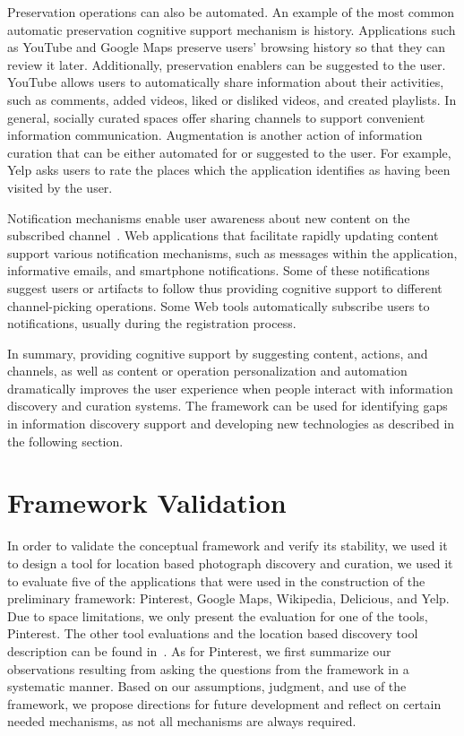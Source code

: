 \documentclass[review]{elsarticle}
\newcommand{\feature}[1]{{\ttfamily#1}}
\begin{document}
{{{{Preservation operations can also be automated. An example of the most common automatic preservation cognitive support mechanism is \feature{history}. Applications such as YouTube and Google Maps preserve users' browsing history so that they can review it later. Additionally, preservation enablers can be \feature{suggested} to the user.
% 
YouTube allows users to \feature{automatically share} information about their activities, such as comments,  added videos, liked or disliked videos, and created playlists. In general, socially curated spaces offer \feature{sharing channels} to support convenient information communication.
%
Augmentation is another action of information curation that can be either \feature{automated} for or \feature{suggested} to the user. For example, Yelp asks users to rate the places which the application identifies as having been visited by the user. 

Notification mechanisms enable user awareness about new content on the subscribed channel~\cite{millen2005social}. Web applications that facilitate rapidly updating content support various notification mechanisms, such as messages within the application, informative emails, and smartphone notifications. Some of these notifications \feature{suggest users or artifacts to follow} thus providing cognitive support to different channel-picking operations. Some Web tools \feature{automatically subscribe} users to notifications, usually during the registration process.
} %

In summary, providing cognitive support by suggesting content, actions, and channels, as well as content or operation personalization and automation dramatically improves the user experience when people interact with information discovery and curation systems. The framework can be used for identifying gaps in information discovery support and developing new technologies as described in the following section.  
}

\section{Framework Validation}
\label{section:validation}
In order to validate the conceptual framework and verify its stability, we used it to design a tool for location based photograph discovery and curation, we used it to evaluate five of the applications that were used in the construction of the preliminary framework: Pinterest, Google Maps, Wikipedia, Delicious, and Yelp. Due to space limitations, we only present the evaluation for one of the tools, Pinterest. The other tool evaluations and the location based discovery tool description can be found in~\cite{voyloshnikova2015}. As for Pinterest, we first summarize our observations resulting from asking the questions from the framework in a systematic manner. Based on our assumptions, judgment, and use of the framework, we propose directions for future development and reflect on certain needed mechanisms, as not all mechanisms are always required. 

}}
\end{document}
